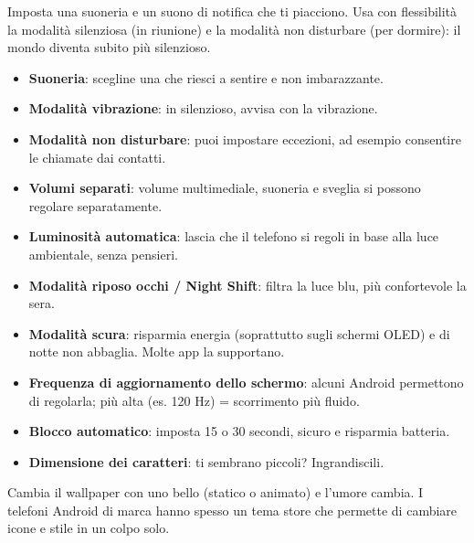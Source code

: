 


Imposta una suoneria e un suono di notifica che ti piacciono. Usa con flessibilità la modalità silenziosa (in riunione) e la modalità non disturbare (per dormire): il mondo diventa subito più silenzioso.

\begin{itemize}
  \item \textbf{Suoneria}: scegline una che riesci a sentire e non imbarazzante.
  \item \textbf{Modalità vibrazione}: in silenzioso, avvisa con la vibrazione.
  \item \textbf{Modalità non disturbare}: puoi impostare eccezioni, ad esempio consentire le chiamate dai contatti.
  \item \textbf{Volumi separati}: volume multimediale, suoneria e sveglia si possono regolare separatamente.
\end{itemize}


\begin{itemize}
  \item \textbf{Luminosità automatica}: lascia che il telefono si regoli in base alla luce ambientale, senza pensieri.
  \item \textbf{Modalità riposo occhi / Night Shift}: filtra la luce blu, più confortevole la sera.
  \item \textbf{Modalità scura}: risparmia energia (soprattutto sugli schermi OLED) e di notte non abbaglia. Molte app la supportano.
  \item \textbf{Frequenza di aggiornamento dello schermo}: alcuni Android permettono di regolarla; più alta (es. 120 Hz) = scorrimento più fluido.
  \item \textbf{Blocco automatico}: imposta 15 o 30 secondi, sicuro e risparmia batteria.
  \item \textbf{Dimensione dei caratteri}: ti sembrano piccoli? Ingrandiscili.
\end{itemize}


Cambia il wallpaper con uno bello (statico o animato) e l'umore cambia. I telefoni Android di marca hanno spesso un tema store che permette di cambiare icone e stile in un colpo solo.

